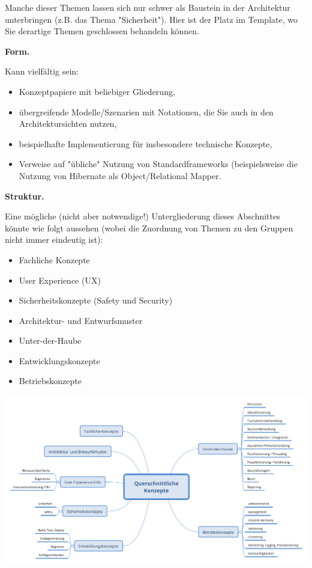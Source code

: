 \documentclass[]{article}
\begin{document}
Manche dieser Themen lassen sich nur schwer als Baustein in der
Architektur unterbringen (z.B. das Thema "Sicherheit"). Hier ist der
Platz im Template, wo Sie derartige Themen geschlossen behandeln können.

\textbf{Form.}

Kann vielfältig sein:

\begin{itemize}
\item
  Konzeptpapiere mit beliebiger Gliederung,
\item
  übergreifende Modelle/Szenarien mit Notationen, die Sie auch in den
  Architektursichten nutzen,
\item
  beispielhafte Implementierung für insbesondere technische Konzepte,
\item
  Verweise auf "übliche" Nutzung von Standardframeworks (beispielsweise
  die Nutzung von Hibernate als Object/Relational Mapper.
\end{itemize}

\textbf{Struktur.}

Eine mögliche (nicht aber notwendige!) Untergliederung dieses
Abschnittes könnte wie folgt aussehen (wobei die Zuordnung von Themen zu
den Gruppen nicht immer eindeutig ist):

\begin{itemize}
\item
  Fachliche Konzepte
\item
  User Experience (UX)
\item
  Sicherheitskonzepte (Safety und Security)
\item
  Architektur- und Entwurfsmuster
\item
  Unter-der-Haube
\item
  Entwicklungskonzepte
\item
  Betriebskonzepte
\end{itemize}

\includegraphics{images/08-Crosscutting-Concepts-Structure-DE.png}
\end{document}
